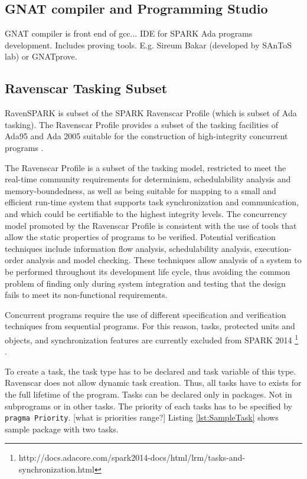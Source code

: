 \subsection{GNAT compiler and Programming Studio}
\label{background:spark:gps}
GNAT compiler is front end of gcc...
IDE for SPARK Ada programs development. Includes proving tools. E.g. Sireum Bakar (developed by SAnToS lab) or GNATprove.


\subsection{Ravenscar Tasking Subset}
\label{background:spark:ravenscar}

RavenSPARK is subset of the SPARK Ravenscar Profile (which is subset of Ada tasking). The Ravenscar Profile provides a subset of the tasking facilities of Ada95 and Ada 2005 suitable for the construction of high-integrity concurrent programs \cite{Ravenscar:Online}.

The Ravenscar Profile is a subset of the tasking model, restricted to meet the real-time community requirements for determinism, schedulability analysis and memory-boundedness, as well as being suitable for mapping to a small and efficient run-time system that supports task synchronization and communication, and which could be certifiable to the highest integrity levels. The concurrency model promoted by the Ravenscar Profile is consistent with the use of tools that allow the static properties of programs to be verified. Potential verification techniques include information flow analysis, schedulability analysis, execution-order analysis and model checking. These techniques allow analysis of a system to be performed throughout its development life cycle, thus avoiding the common problem of finding only during system integration and testing that the design fails to meet its non-functional requirements. \cite{Ravenscar:Article}

Concurrent programs require the use of different specification and verification techniques from sequential programs. For this reason, tasks, protected units and objects, and synchronization features are currently excluded from SPARK 2014 \footnote{http://docs.adacore.com/spark2014-docs/html/lrm/tasks-and-synchronization.html} \cite{Spark2014refManual:Online}.

To create a task, the task type has to be declared and task variable of this type. Ravenscar does not allow dynamic task creation. Thus, all tasks have to exists for the full lifetime of the program. \cite{IssuesWithRavenscar:Paper} Tasks can be declared only in packages. Not in subprograms or in other tasks. \cite{Barnes:Book} The priority of each tasks has to be specified by \lstinline{pragma Priority}. [what is priorities range?] Listing \ref{lst:SampleTask} shows sample package with two tasks.

